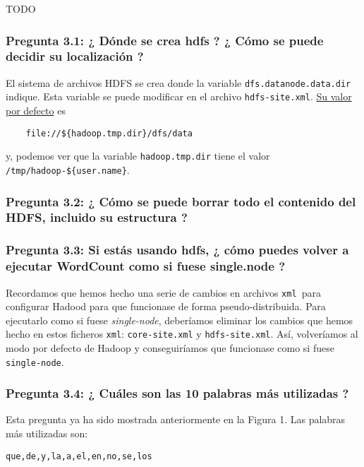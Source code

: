 \documentclass[11pt]{article}
\def\inline{\lstinline[basicstyle=\ttfamily,keywordstyle={}]}
\begin{document}
TODO





\subsubsection*{ Pregunta 3.1: ¿ Dónde se crea hdfs ? ¿ Cómo se puede decidir su localización ? }

El sistema de archivos HDFS se crea donde la variable \inline{dfs.datanode.data.dir }indique. Esta variable se puede modificar en el archivo  \inline{hdfs-site.xml}. \href{https://hadoop.apache.org/docs/r2.4.1/hadoop-project-dist/hadoop-hdfs/hdfs-default.xml}{Su valor por defecto} es
\begin{verbatim}
	file://${hadoop.tmp.dir}/dfs/data
\end{verbatim}
y, podemos ver que la variable  \inline{hadoop.tmp.dir} tiene el valor \inline|/tmp/hadoop-${user.name}|.


\subsubsection*{ Pregunta 3.2: ¿ Cómo se puede borrar todo el contenido del HDFS, incluido su estructura ?}


\subsubsection*{ Pregunta 3.3: Si estás usando hdfs, ¿ cómo puedes volver a ejecutar WordCount como si fuese single.node ? }

Recordamos que hemos hecho una serie de cambios en archivos \inline{xml }para configurar Hadood para que funcionase de forma pseudo-distribuida. Para ejecutarlo como si fuese \emph{single-node}, deberíamos eliminar los cambios que hemos hecho en estos ficheros  \inline{xml}:  \inline{core-site.xml} y  \inline{hdfs-site.xml}. Así, volveríamos al modo por defecto de Hadoop y conseguiríamos que funcionase como si fuese  \inline{single-node}.


\subsubsection*{ Pregunta 3.4: ¿ Cuáles son las 10 palabras más utilizadas ? }

Esta pregunta ya ha sido mostrada anteriormente en la Figura 1. Las palabras más utilizadas son:

\begin{verbatim}
que,de,y,la,a,el,en,no,se,los
\end{verbatim}
\end{document}
